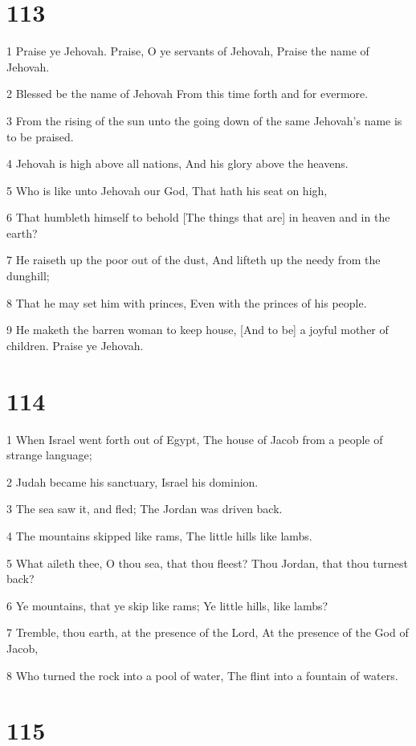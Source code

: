 \chapter{113}

\par 1 Praise ye Jehovah. Praise, O ye servants of Jehovah, Praise the name of Jehovah.
\par 2 Blessed be the name of Jehovah From this time forth and for evermore.
\par 3 From the rising of the sun unto the going down of the same Jehovah's name is to be praised.
\par 4 Jehovah is high above all nations, And his glory above the heavens.
\par 5 Who is like unto Jehovah our God, That hath his seat on high,
\par 6 That humbleth himself to behold [The things that are] in heaven and in the earth?
\par 7 He raiseth up the poor out of the dust, And lifteth up the needy from the dunghill;
\par 8 That he may set him with princes, Even with the princes of his people.
\par 9 He maketh the barren woman to keep house, [And to be] a joyful mother of children. Praise ye Jehovah.

\chapter{114}

\par 1 When Israel went forth out of Egypt, The house of Jacob from a people of strange language;
\par 2 Judah became his sanctuary, Israel his dominion.
\par 3 The sea saw it, and fled; The Jordan was driven back.
\par 4 The mountains skipped like rams, The little hills like lambs.
\par 5 What aileth thee, O thou sea, that thou fleest? Thou Jordan, that thou turnest back?
\par 6 Ye mountains, that ye skip like rams; Ye little hills, like lambs?
\par 7 Tremble, thou earth, at the presence of the Lord, At the presence of the God of Jacob,
\par 8 Who turned the rock into a pool of water, The flint into a fountain of waters.

\chapter{115}

